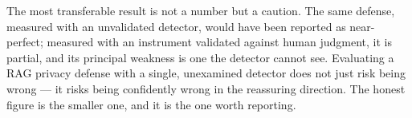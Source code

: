 \documentclass[11pt,a4paper]{article}
\begin{document}
The most transferable result is not a number but a caution. The same defense, measured with an
unvalidated detector, would have been reported as near-perfect; measured with an instrument validated
against human judgment, it is partial, and its principal weakness is one the detector cannot see.
Evaluating a RAG privacy defense with a single, unexamined detector does not just risk being wrong --- it
risks being confidently wrong in the reassuring direction. The honest figure is the smaller one, and it
is the one worth reporting.
\end{document}
